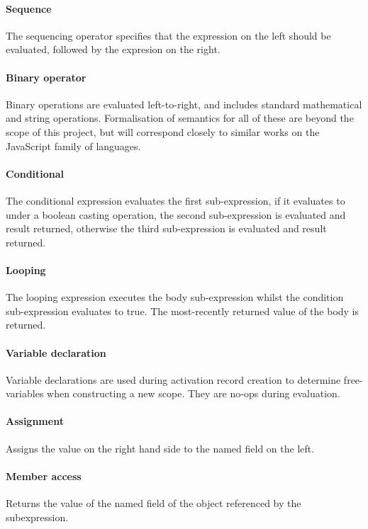 \documentclass[a4paper]{article}
\begin{document}
\paragraph{Sequence} The sequencing operator specifies that the expression on the left should be
evaluated, followed by the expresion on the right.

\paragraph{Binary operator} Binary operations are evaluated left-to-right, and includes standard
mathematical and string operations. Formalisation of semantics for all of these
are beyond the scope of this project, but will correspond closely to similar
works on the JavaScript family of languages.

\paragraph{Conditional} The conditional expression evaluates the first sub-expression, if it evaluates
to  under a boolean casting operation, the second sub-expression is
evaluated and result returned, otherwise the third sub-expression is evaluated
and result returned.

\paragraph{Looping} The looping expression executes the body sub-expression whilst the condition
sub-expression evaluates to true. The most-recently returned value of the body
is returned.

\paragraph{Variable declaration} Variable declarations are used during activation
record creation
to determine free-variables when constructing a new scope. They are no-ops
during evaluation.

\paragraph{Assignment} Assigns the value on the right hand side to the named field on the
left.

\paragraph{Member access} Returns the value of the named field of the object referenced by
the subexpression.
\end{document}
